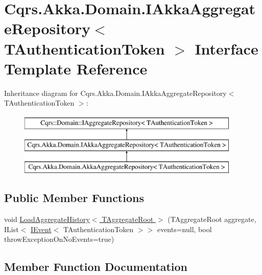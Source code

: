 \hypertarget{interfaceCqrs_1_1Akka_1_1Domain_1_1IAkkaAggregateRepository}{}\section{Cqrs.\+Akka.\+Domain.\+I\+Akka\+Aggregate\+Repository$<$ T\+Authentication\+Token $>$ Interface Template Reference}
\label{interfaceCqrs_1_1Akka_1_1Domain_1_1IAkkaAggregateRepository}
Inheritance diagram for Cqrs.\+Akka.\+Domain.\+I\+Akka\+Aggregate\+Repository$<$ T\+Authentication\+Token $>$\+:\begin{figure}[H]
\begin{center}
\leavevmode
\includegraphics[height=3.000000cm]{interfaceCqrs_1_1Akka_1_1Domain_1_1IAkkaAggregateRepository}
\end{center}
\end{figure}
\subsection*{Public Member Functions}
\begin{DoxyCompactItemize}
\item 
void \hyperlink{interfaceCqrs_1_1Akka_1_1Domain_1_1IAkkaAggregateRepository_a9010b259daf5d09f7269277361015ddf}{Load\+Aggregate\+History$<$ T\+Aggregate\+Root $>$} (T\+Aggregate\+Root aggregate, I\+List$<$ \hyperlink{interfaceCqrs_1_1Events_1_1IEvent}{I\+Event}$<$ T\+Authentication\+Token $>$$>$ events=null, bool throw\+Exception\+On\+No\+Events=true)
\end{DoxyCompactItemize}


\subsection{Member Function Documentation}
\mbox{\label{interfaceCqrs_1_1Akka_1_1Domain_1_1IAkkaAggregateRepository_a9010b259daf5d09f7269277361015ddf}} 
